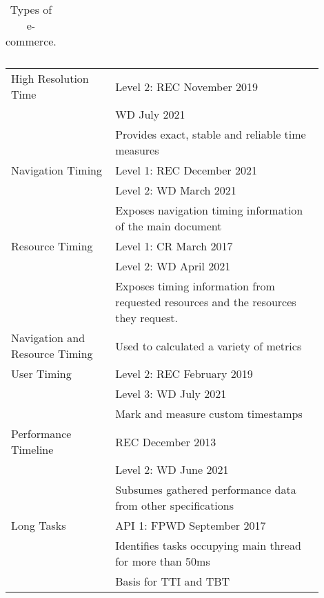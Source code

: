 


\begin{table}[h]
	\small
	\centering
	\begin{tabular}{| c | c | c | c |}
	\end{tabular}
	\medskip
	\caption{Types of e-commerce.}
	\label{table:types_ecommerce}
\end{table}


\begin{table}[h]
	\small
	\centering
	\begin{tabular}{ | p{0.3\linewidth} | p{0.6\linewidth} | }
	\hline
	High Resolution Time
	& Level 2: REC November 2019 \\
	& WD July 2021 \\
	& Provides exact, stable and reliable time measures \\
	\hline
	Navigation Timing
	& Level 1: REC December 2021 \\
	& Level 2: WD March 2021 \\
	& Exposes navigation timing information of the main document \\
	\hline
	Resource Timing
	& Level 1: CR March 2017 \\
	& Level 2: WD April 2021 \\
	& Exposes timing information from requested resources and the resources they request.  \\
	\hline
	Navigation and Resource Timing
	& Used to calculated a variety of metrics \\
	\hline
	\hline
	User Timing
	& Level 2: REC February 2019 \\
	& Level 3: WD July 2021 \\
	& Mark and measure custom timestamps \\
	\hline
	Performance Timeline
	& REC December 2013 \\
	& Level 2: WD June 2021 \\
	& Subsumes gathered performance data from other specifications \\
	\hline
	Long Tasks
	& API 1: FPWD  September 2017 \\
	& Identifies tasks occupying main thread for more than 50ms \\
	& Basis for TTI and TBT \\

\end{tabular}
\end{table}
